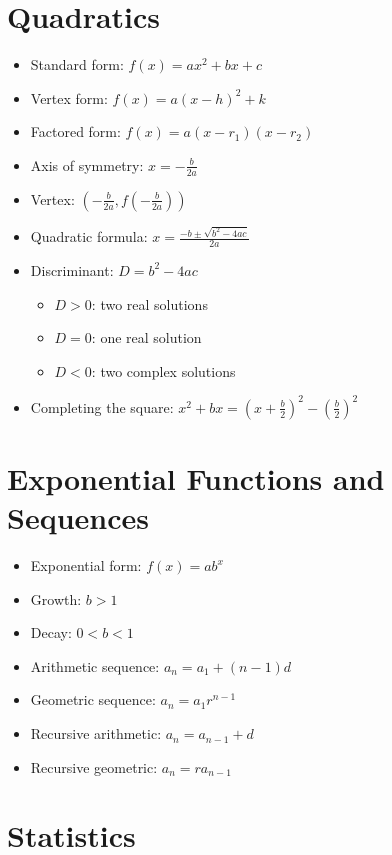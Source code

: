 \documentclass[11pt]{book}
\begin{document}
\section{Quadratics}

\begin{itemize}
\item Standard form: \(f(x)=ax^2+bx+c\)
\item Vertex form: \(f(x)=a(x-h)^2+k\)
\item Factored form: \(f(x)=a(x-r_1)(x-r_2)\)
\item Axis of symmetry: \(x=-\frac{b}{2a}\)
\item Vertex: \(\left(-\frac{b}{2a}, f\left(-\frac{b}{2a}\right)\right)\)
\item Quadratic formula: \(x=\frac{-b\pm\sqrt{b^2-4ac}}{2a}\)
\item Discriminant: \(D=b^2-4ac\)
\begin{itemize}
\item \(D>0\): two real solutions
\item \(D=0\): one real solution
\item \(D<0\): two complex solutions
\end{itemize}
\item Completing the square: \(x^2+bx=(x+\frac b2)^2-(\frac b2)^2\)
\end{itemize}

\section{Exponential Functions and Sequences}

\begin{itemize}
\item Exponential form: \(f(x)=ab^x\)
\item Growth: \(b>1\)
\item Decay: \(0<b<1\)
\item Arithmetic sequence: \(a_n=a_1+(n-1)d\)
\item Geometric sequence: \(a_n=a_1r^{n-1}\)
\item Recursive arithmetic: \(a_n=a_{n-1}+d\)
\item Recursive geometric: \(a_n=ra_{n-1}\)
\end{itemize}

\section{Statistics}
\end{document}
